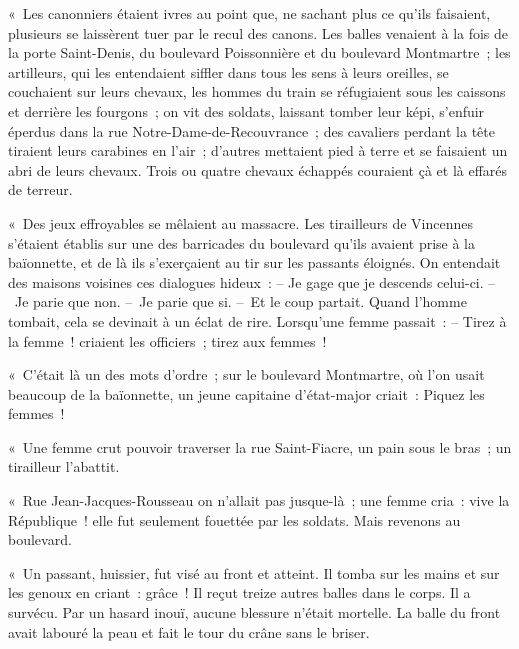 \documentclass[french,twoside]{book} %
\begin{document}
« Les canonniers étaient ivres au point que, ne sachant plus ce qu’ils faisaient, plusieurs se laissèrent tuer par le recul des canons. Les balles venaient à la fois de la porte Saint-Denis, du boulevard Poissonnière et du boulevard Montmartre ; les artilleurs, qui les entendaient siffler dans tous les sens à leurs oreilles, se couchaient sur leurs chevaux, les hommes du train se réfugiaient sous les caissons et derrière les fourgons ; on vit des soldats, laissant tomber leur képi, s’enfuir éperdus dans la rue Notre-Dame-de-Recouvrance ; des cavaliers perdant la tête tiraient leurs carabines en l’air ; d’autres mettaient pied à terre et se faisaient un abri de leurs chevaux. Trois ou quatre chevaux échappés couraient çà et là effarés de terreur.\par
« Des jeux effroyables se mêlaient au massacre. Les tirailleurs de Vincennes s’étaient établis sur une des barricades du boulevard qu’ils avaient prise à la baïonnette, et de là ils s’exerçaient au tir sur les passants éloignés. On entendait des maisons voisines ces dialogues hideux : – Je gage que je descends celui-ci. – Je parie que non. – Je parie que si. – Et le coup partait. Quand l’homme tombait, cela se devinait à un éclat de rire. Lorsqu’une femme passait : – Tirez à la femme ! criaient les officiers ; tirez aux femmes !\par
« C’était là un des mots d’ordre ; sur le boulevard Montmartre, où l’on usait beaucoup de la baïonnette, un jeune capitaine d’état-major criait : Piquez les femmes !\par
« Une femme crut pouvoir traverser la rue Saint-Fiacre, un pain sous le bras ; un tirailleur l’abattit.\par
« Rue Jean-Jacques-Rousseau on n’allait pas jusque-là ; une femme cria : vive la République ! elle fut seulement fouettée par les soldats. Mais revenons au boulevard.\par
« Un passant, huissier, fut visé au front et atteint. Il tomba sur les mains et sur les genoux en criant : grâce ! Il reçut treize autres balles dans le corps. Il a survécu. Par un hasard inouï, aucune blessure n’était mortelle. La balle du front avait labouré la peau et fait le tour du crâne sans le briser.\par
\end{document}
